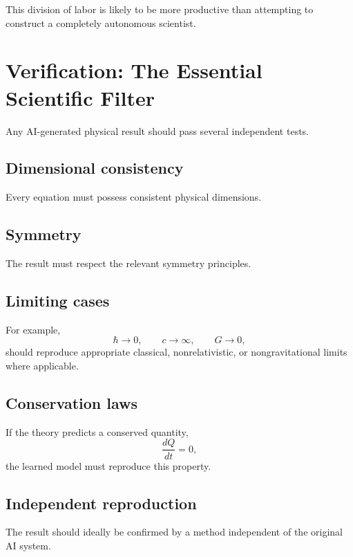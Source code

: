 \documentclass[11pt,a4paper]{article}
\begin{document}
This division of labor is likely to be more productive than attempting to
construct a completely autonomous scientist.

\section{Verification: The Essential Scientific Filter}

Any AI-generated physical result should pass several independent tests.

\subsection{Dimensional consistency}

Every equation must possess consistent physical dimensions.

\subsection{Symmetry}

The result must respect the relevant symmetry principles.

\subsection{Limiting cases}

For example,
\begin{equation}
\hbar\rightarrow0,
\qquad
c\rightarrow\infty,
\qquad
G\rightarrow0,
\end{equation}
should reproduce appropriate classical, nonrelativistic, or nongravitational
limits where applicable.

\subsection{Conservation laws}

If the theory predicts a conserved quantity,
\begin{equation}
\frac{dQ}{dt}=0,
\end{equation}
the learned model must reproduce this property.

\subsection{Independent reproduction}

The result should ideally be confirmed by a method independent of the original
AI system.
\end{document}
